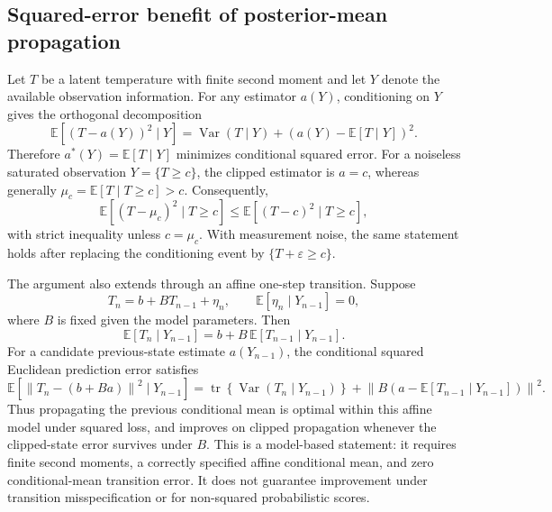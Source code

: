 \subsection{Squared-error benefit of posterior-mean propagation}

Let \(T\) be a latent temperature with finite second moment and let \(Y\)
denote the available observation information. For any estimator \(a(Y)\),
conditioning on \(Y\) gives the orthogonal decomposition
\[
\mathbb{E}\!\left[(T-a(Y))^2\mid Y\right]
=
\operatorname{Var}(T\mid Y)
+
\left(a(Y)-\mathbb{E}[T\mid Y]\right)^2.
\]
Therefore \(a^*(Y)=\mathbb{E}[T\mid Y]\) minimizes conditional squared error.
For a noiseless saturated observation \(Y=\{T\geq c\}\), the clipped
estimator is \(a=c\), whereas generally
\(
\mu_c=\mathbb{E}[T\mid T\geq c]>c
\).
Consequently,
\[
\mathbb{E}\!\left[(T-\mu_c)^2\mid T\geq c\right]
\leq
\mathbb{E}\!\left[(T-c)^2\mid T\geq c\right],
\]
with strict inequality unless \(c=\mu_c\). With measurement noise, the same
statement holds after replacing the conditioning event by
\(\{T+\varepsilon\geq c\}\).

The argument also extends through an affine one-step transition. Suppose
\[
T_n=b+B T_{n-1}+\eta_n,
\qquad
\mathbb{E}[\eta_n\mid Y_{n-1}]=0,
\]
where \(B\) is fixed given the model parameters. Then
\[
\mathbb{E}[T_n\mid Y_{n-1}]
=b+B\,\mathbb{E}[T_{n-1}\mid Y_{n-1}].
\]
For a candidate previous-state estimate \(a(Y_{n-1})\), the conditional
squared Euclidean prediction error satisfies
\[
\mathbb{E}\!\left[
\left\|T_n-(b+B a)\right\|^2
\mid Y_{n-1}
\right]
=
\operatorname{tr}\!\left\{\operatorname{Var}(T_n\mid Y_{n-1})\right\}
+
\left\|B\left(a-\mathbb{E}[T_{n-1}\mid Y_{n-1}]\right)\right\|^2.
\]
Thus propagating the previous conditional mean is optimal within this affine
model under squared loss, and improves on clipped propagation whenever the
clipped-state error survives under \(B\). This is a model-based statement: it
requires finite second moments, a correctly specified affine conditional mean,
and zero conditional-mean transition error. It does not guarantee improvement
under transition misspecification or for non-squared probabilistic scores.
